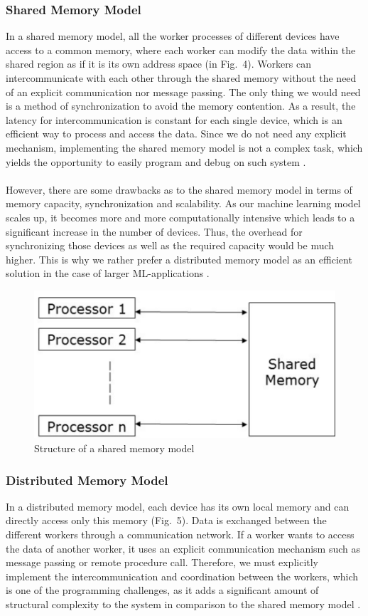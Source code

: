 \documentclass[ieeetran]{article}
\begin{document}
\subsubsection{Shared Memory Model} %
\label{ssub:shared_memory_model}
In a shared memory model, all the worker processes of different devices have access to a common memory, where each worker can modify the data within the shared region as if it is its own address space (in Fig.\ 4). Workers can intercommunicate with each other through the shared memory without the need of an explicit communication nor message passing. The only thing we would need is a method of synchronization to avoid the memory contention. As a result, the latency for intercommunication is constant for each single device, which is an efficient way to process and access the data. Since we do not need any explicit mechanism, implementing the shared memory model is not a complex task, which yields the opportunity to easily program and debug on such system \cite{second} \cite{third}. 
\\ \\However, there are some drawbacks as to the shared memory model in terms of memory capacity, synchronization and scalability. As our machine learning model scales up, it becomes more and more computationally intensive which leads to a significant increase in the number of devices. Thus, the overhead for synchronizing those devices as well as the required capacity would be much higher. This is why we rather prefer a distributed memory model as an efficient solution in the case of larger ML-applications \cite{third}.


\begin{figure}[h!]
  \centering
  \includegraphics[width=0.4\linewidth]{sharedmemorymodel}
  \caption{Structure of a shared memory model}
  \label{fig:sharedmemorymodel}
\end{figure}


\subsubsection{Distributed Memory Model} %
\label{ssub:distributed_memory_model}
In a distributed memory model, each device has its own local memory and can directly access only this memory (Fig.\ 5). Data is exchanged between the different workers through a communication network. If a worker wants to access the data of another worker, it uses an explicit communication mechanism such as message passing or remote procedure call. Therefore, we must explicitly implement the intercommunication and coordination between the workers, which is one of the programming challenges, as it adds a significant amount of structural complexity to the system in comparison to the shared memory model \cite{third}. 
\end{document}
